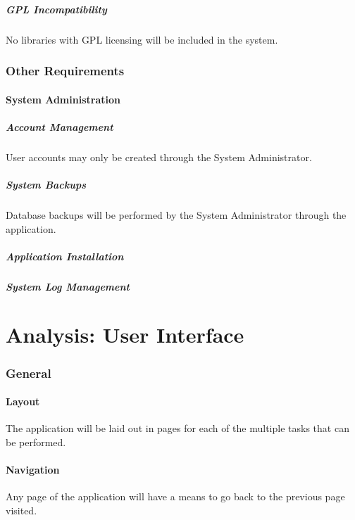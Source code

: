 \documentclass{article}
\begin{document}
\subsubsection{GPL Incompatibility}
No libraries with GPL licensing will be included in the system.

\section{Other Requirements}
\subsection{System Administration}
\subsubsection{Account Management}
User accounts may only be created through the System Administrator.
\subsubsection{System Backups}
Database backups will be performed by the System Administrator
through the application.
\subsubsection{Application Installation}
\subsubsection{System Log Management}

\part{Analysis: User Interface}

\section{General}
\subsection{Layout}
The application will be laid out in pages for each of the multiple tasks that
can be performed.
\subsection{Navigation}
Any page of the application will have a means to go back to the previous
page visited.
\end{document}
